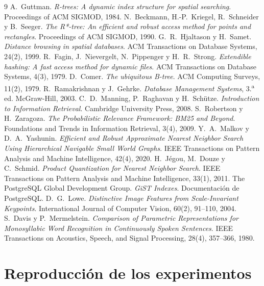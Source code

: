 \documentclass[11pt,a4paper]{article}
\begin{document}
\begin{thebibliography}{9}
 A.~Guttman. \emph{R-trees: A dynamic index structure for spatial searching}. Proceedings of ACM SIGMOD, 1984.
 N.~Beckmann, H.-P.~Kriegel, R.~Schneider y B.~Seeger. \emph{The R*-tree: An efficient and robust access method for points and rectangles}. Proceedings of ACM SIGMOD, 1990.
 G.~R.~Hjaltason y H.~Samet. \emph{Distance browsing in spatial databases}. ACM Transactions on Database Systems, 24(2), 1999.
 R.~Fagin, J.~Nievergelt, N.~Pippenger y H.~R.~Strong. \emph{Extendible hashing: A fast access method for dynamic files}. ACM Transactions on Database Systems, 4(3), 1979.
 D.~Comer. \emph{The ubiquitous B-tree}. ACM Computing Surveys, 11(2), 1979.
 R.~Ramakrishnan y J.~Gehrke. \emph{Database Management Systems}, 3.\textsuperscript{a} ed. McGraw-Hill, 2003.
 C.~D.~Manning, P.~Raghavan y H.~Schütze. \emph{Introduction to Information Retrieval}. Cambridge University Press, 2008.
 S.~Robertson y H.~Zaragoza. \emph{The Probabilistic Relevance Framework: BM25 and Beyond}. Foundations and Trends in Information Retrieval, 3(4), 2009.
 Y.~A.~Malkov y D.~A.~Yashunin. \emph{Efficient and Robust Approximate Nearest Neighbor Search Using Hierarchical Navigable Small World Graphs}. IEEE Transactions on Pattern Analysis and Machine Intelligence, 42(4), 2020.
 H.~Jégou, M.~Douze y C.~Schmid. \emph{Product Quantization for Nearest Neighbor Search}. IEEE Transactions on Pattern Analysis and Machine Intelligence, 33(1), 2011.
 The PostgreSQL Global Development Group. \emph{GiST Indexes}. Documentación de PostgreSQL.
 D.~G.~Lowe. \emph{Distinctive Image Features from Scale-Invariant Keypoints}. International Journal of Computer Vision, 60(2), 91--110, 2004.
 S.~Davis y P.~Mermelstein. \emph{Comparison of Parametric Representations for Monosyllabic Word Recognition in Continuously Spoken Sentences}. IEEE Transactions on Acoustics, Speech, and Signal Processing, 28(4), 357--366, 1980.
\end{thebibliography}

\appendix
\section{Reproducción de los experimentos}
\label{sec:reproducir}
\end{document}
